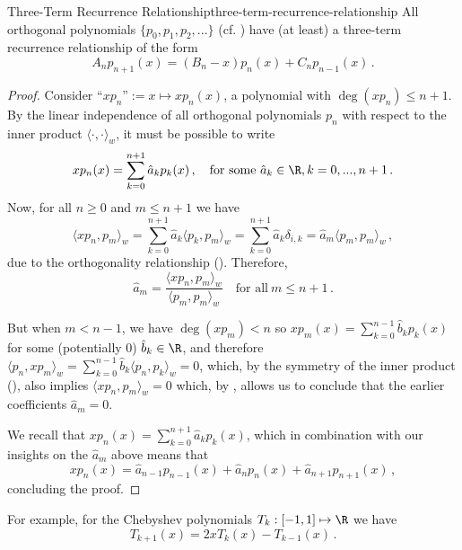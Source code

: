 \begin{theorem}{Three-Term Recurrence Relationship}{three-term-recurrence-relationship}
  All orthogonal polynomials $\{p_0, p_1, p_2, ...\}$ (cf. ) have (at least) a three-term recurrence relationship of the form
  $$A_n p_{n+1}(x) = (B_n - x) p_n(x) + C_n p_{n-1}(x)\,.$$
\end{theorem}
\begin{proof}
  Consider ``$x p_n$''$:= x \mapsto x p_n(x)$, a polynomial with $\deg(x p_n) \le n+1$.
  By the linear independence of all orthogonal polynomials $p_n$ with respect to the inner product $\langle \cdot, \cdot \rangle_w$, it must be possible to write
  $$x p_n(x) = \sum_{k=0}^{n+1} \hat{a}_k p_k(x)\,,\quad \text{for some}~\hat{a}_k \in \R, k=0, ..., n+1\,.$$
  Now, for all $n \ge 0$ and $m \le n+1$ we have
  $$\langle xp_n, p_m \rangle_w = \sum_{k=0}^{n+1} \hat{a}_k \langle p_k, p_m \rangle_w = \sum_{k=0}^{n+1} \hat{a}_k \delta_{i,k} = \hat{a}_m \langle p_m, p_m \rangle_w\,,$$
  due to the orthogonality relationship ().
  Therefore,
  \begin{equation}
    \hat{a}_m = \frac{\langle xp_n, p_m \rangle_w}{\langle p_m, p_m \rangle_w} \quad\text{for all}~m \le n+1\,.
    \label{eq:three-term-step}
  \end{equation}

  But when \underline{$m < n-1$}, we have $\deg(xp_m) < n$ so $x p_m(x) = \sum_{k=0}^{n-1} \hat{b}_k p_k(x)$ for some (potentially 0) $\hat{b}_k \in \R$, and therefore $\langle p_n, xp_m \rangle_w = \sum_{k=0}^{n-1} \hat{b}_k \langle p_n, p_k \rangle_w = 0$,
  which, by the symmetry of the inner product (), also implies $\langle x p_n, p_m \rangle_w = 0$ which, by , allows us to conclude that the earlier coefficients $\hat{a}_m = 0$.


  We recall that $xp_n(x) = \sum_{k=0}^{n+1} \hat{a}_k p_k(x)$, which in combination with our insights on the $\hat{a}_m$ above means that
  $$xp_n(x) = \hat{a}_{n-1} p_{n-1}(x) + \hat{a}_{n} p_n(x) + \hat{a}_{n+1} p_{n+1}(x)\,,$$
  concluding the proof.
\end{proof}

For example, for the Chebyshev polynomials $T_k: [-1, 1] \mapsto \R$ we have
$$T_{k+1}(x) = 2x T_k(x) - T_{k-1}(x) \,.$$

